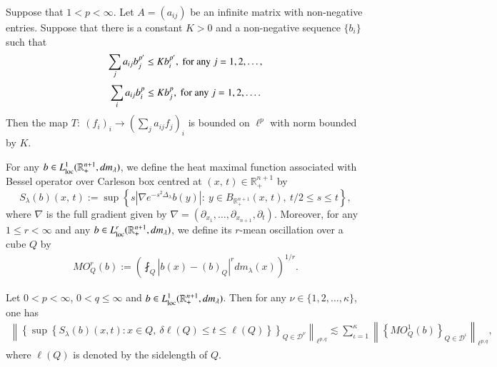 \documentclass[12pt]{amsart}
\begin{document}
\begin{lemma}\label{SchurL}
Suppose that $1<p<\infty$. Let $A=(a_{ij})$ be an infinite matrix with non-negative entries. Suppose that there is a constant $K>0$ and a non-negative sequence $\{b_i\}$ such that
$$\sum_ja_{ij}b_j^{p'}\leq Kb_i^{p'},\ {\rm for}\ {\rm any}\ j=1,2,\ldots,$$
$$\sum_ia_{ij}b_i^p\leq Kb_j^p,\ {\rm for}\ {\rm any}\ j=1,2,\ldots.$$
Then the map $T:\ (f_i)_i\rightarrow (\sum_{j}a_{ij}f_j)_i$ is bounded on $\ell^p$ with norm bounded by $K$.
\end{lemma}
For any $b\in L_{{\rm loc}}^1(\mathbb{R}_+^{n+1},dm_\lambda)$, we define the heat maximal function associated with Bessel operator over Carleson box centred at $(x,\,t)\in\mathbb{R}_+^{n+1}$ by $$S_\lambda(b)(x,\,t):=\sup\left\{s\left|\nabla e^{-s^2 {\Delta_\lambda}}b(y)\right|:\ y\in B_{\mathbb{R}_+^{n+1}}(x,\,t),\ t/2\leq s\leq t\right\},$$
where $\nabla$ is the full gradient given by $\nabla=(\partial_{x_1},\ldots,\partial_{x_{n+1}},\partial_t)$.
Moreover, for any $1\leq r<\infty$ and any $b\in L_{{\rm loc}}^r(\mathbb{R}_+^{n+1},dm_\lambda)$, we define its {\color{red}$r$-mean oscillation} over a cube $Q$ by
\begin{align*}
MO_Q^r(b):=\left(\fint_{Q}|b(x)-(b)_Q|^rdm_\lambda(x)\right)^{1/r}.
\end{align*}
\begin{lemma}\label{aujxi}
Let $0<p<\infty$, $0<q\leq \infty$ and $b\in L_{{\rm loc}}^1(\mathbb{R}_+^{n+1},dm_\lambda)$. Then for any $\nu\in\{1,2,\ldots ,\kappa\}$, one has
\begin{align*}
\left\|\left\{\sup\limits\left\{S_\lambda(b)(x,t):x\in Q,\ \delta\ell(Q)\leq t\leq \ell(Q)\right\}\right\}_{Q\in\mathcal{D}^\nu}\right\|_{\ell^{p,q}}\lesssim\sum_{\iota=1}^\kappa\left\|\left\{MO_Q^1(b)\right\}_{Q\in\mathcal{D}^\iota}\right\|_{\ell^{p,q}},
\end{align*}
where $\ell(Q)$ is denoted by the sidelength of $Q$.
\end{lemma}
\end{document}
